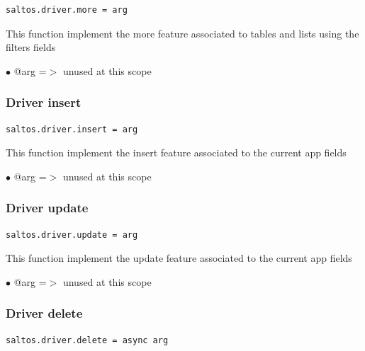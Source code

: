 \documentclass[a4paper]{article}
\begin{document}
\begin{lstlisting}
saltos.driver.more = arg
\end{lstlisting}

This function implement the more feature associated to tables and lists
using the filters fields

\begin{compactitem}
\item[\color{myblue}$\bullet$] @arg =$>$ unused at this scope
\end{compactitem}

\hypertarget{toc174}{}
\subsubsection{Driver insert}

\begin{lstlisting}
saltos.driver.insert = arg
\end{lstlisting}

This function implement the insert feature associated to the current app fields

\begin{compactitem}
\item[\color{myblue}$\bullet$] @arg =$>$ unused at this scope
\end{compactitem}

\hypertarget{toc175}{}
\subsubsection{Driver update}

\begin{lstlisting}
saltos.driver.update = arg
\end{lstlisting}

This function implement the update feature associated to the current app fields

\begin{compactitem}
\item[\color{myblue}$\bullet$] @arg =$>$ unused at this scope
\end{compactitem}

\hypertarget{toc176}{}
\subsubsection{Driver delete}

\begin{lstlisting}
saltos.driver.delete = async arg
\end{lstlisting}
\end{document}
